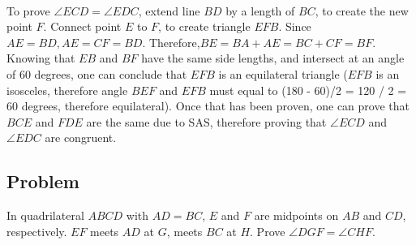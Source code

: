 \documentclass{article}
\begin{document}

\\
To prove $\angle ECD =\angle EDC$, extend line $BD$ by a length of $BC$, to create the new point $F$. Connect point $E$ to $F$, to create triangle $EFB$. Since $AE = BD, AE = CF = BD. $
Therefore,$ BE = BA + AE = BC + CF = BF$. Knowing that $EB$ and $BF$ have the same side lengths, and intersect at an angle of 60 degrees, one can conclude that $EFB$ is an equilateral triangle ($EFB$ is an isosceles, therefore angle $BEF$ and $EFB$ must equal to 
(180 - 60)/2 = 120 / 2 = 60 degrees, therefore equilateral). 
Once that has been proven, one can prove that $BCE$ and $FDE$ are the same due to SAS, therefore proving that $\angle ECD$ and $\angle EDC$ are congruent.
\pagebreak
\subsection{Problem}
In quadrilateral $ABCD$ with $AD = BC$, $E$ and $F$ are midpoints on $AB$ and $CD$, respectively. $EF$ meets $AD$ at $G$, meets $BC$ at $H$. Prove $\angle DGF = \angle CHF$.
\end{document}

